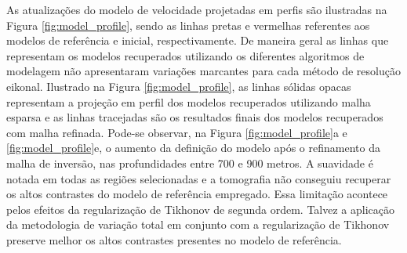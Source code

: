 As atualizações do modelo de velocidade projetadas em perfis são ilustradas na Figura \ref{fig:model_profile}, sendo as linhas pretas e vermelhas referentes aos modelos de referência e inicial, respectivamente. De maneira geral as linhas que representam os modelos recuperados utilizando os diferentes algoritmos de modelagem não apresentaram variações marcantes para cada método de resolução eikonal. Ilustrado na Figura \ref{fig:model_profile}, as linhas sólidas opacas representam a projeção em perfil dos modelos recuperados utilizando malha esparsa e as linhas tracejadas são os resultados finais dos modelos recuperados com malha refinada. Pode-se observar, na Figura \ref{fig:model_profile}a e \ref{fig:model_profile}e, o aumento da definição do modelo após o refinamento da malha de inversão, nas profundidades entre 700 e 900 metros. A suavidade é notada em todas as regiões selecionadas e a tomografia não conseguiu recuperar os altos contrastes do modelo de referência empregado. Essa limitação acontece pelos efeitos da regularização de Tikhonov de segunda ordem. Talvez a aplicação da metodologia de variação total em conjunto com a regularização de Tikhonov \cite{jiang20183d} preserve melhor os altos contrastes presentes no modelo de referência. 

